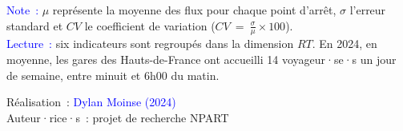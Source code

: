     \begin{table}[h!]
    \centering
    \renewcommand{\arraystretch}{1.5}
    \caption{Grille d'indicateurs regroupés dans la dimension associée à la  (demande).}
    \label{table-chap6:indicateurs-ridership}
        \vspace{5pt}
        \begin{flushleft}\scriptsize{
        \textcolor{blue}{Note~:} \(\mu\) représente la moyenne des flux pour chaque point d'arrêt, $\sigma$ l'erreur standard et \(CV\) le coefficient de variation (\(CV~=~\frac{\sigma}{\mu} \times 100\)).
        \\
        \textcolor{blue}{Lecture~:} six indicateurs sont regroupés dans la dimension \(RT\). En 2024, en moyenne, les gares des Hauts-de-France ont accueilli 14 voyageur·se·s un jour de semaine, entre minuit et 6h00 du matin.
        }\end{flushleft}
        \begin{flushright}\scriptsize{
        Réalisation~: \textcolor{blue}{Dylan Moinse (2024)}
        \\
        Auteur·rice·s~: projet de recherche \acrshort{NPART}
        }\end{flushright}
        \end{table}